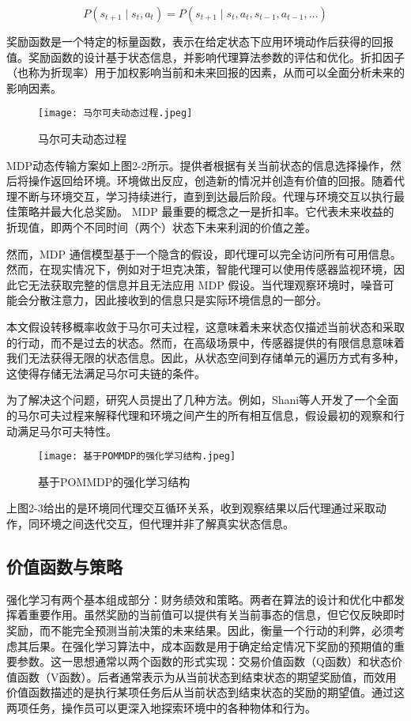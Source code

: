 \[
P(s_{t+1} \mid s_t, a_t) = P(s_{t+1} \mid s_t, a_t, s_{t-1}, a_{t-1}, \ldots)
\]

奖励函数是一个特定的标量函数，表示在给定状态下应用环境动作后获得的回报值。奖励函数的设计基于状态信息，并影响代理算法参数的评估和优化。折扣因子（也称为折现率）用于加权影响当前和未来回报的因素，从而可以全面分析未来的影响因素。

\begin{figure}[hbt]
	\centering
	\texttt{[image: 马尔可夫动态过程.jpeg]}
	\caption{马尔可夫动态过程}
	\label{f.example}
\end{figure}

MDP动态传输方案如上图2-2所示。提供者根据有关当前状态的信息选择操作，然后将操作返回给环境。环境做出反应，创造新的情况并创造有价值的回报。随着代理不断与环境交互，学习持续进行，直到到达最后阶段。代理与环境交互以执行最佳策略并最大化总奖励。 MDP 最重要的概念之一是折扣率。它代表未来收益的折现值，即两个不同时间（两个）状态下未来利润的价值之差。

然而，MDP 通信模型基于一个隐含的假设，即代理可以完全访问所有可用信息。然而，在现实情况下，例如对于坦克决策，智能代理可以使用传感器监视环境，因此它无法获取完整的信息并且无法应用 MDP 假设。当代理观察环境时，噪音可能会分散注意力，因此接收到的信息只是实际环境信息的一部分。

本文假设转移概率收敛于马尔可夫过程，这意味着未来状态仅描述当前状态和采取的行动，而不是过去的状态。然而，在高级场景中，传感器提供的有限信息意味着我们无法获得无限的状态信息。因此，从状态空间到存储单元的遍历方式有多种，这使得存储无法满足马尔可夫链的条件。

为了解决这个问题，研究人员提出了几种方法。例如，Shani\cite{shani2013survey}等人开发了一个全面的马尔可夫过程来解释代理和环境之间产生的所有相互信息，假设最初的观察和行动满足马尔可夫特性。

\begin{figure}[hbt]
	\centering
	\texttt{[image: 基于POMMDP的强化学习结构.jpeg]}
	\caption{基于POMMDP的强化学习结构}
	\label{f.example}
\end{figure}

上图2-3给出的是环境同代理交互循环关系，收到观察结果以后代理通过采取动作，同环境之间迭代交互，但代理并非了解真实状态信息。

\subsection{价值函数与策略}


强化学习有两个基本组成部分：财务绩效和策略。两者在算法的设计和优化中都发挥着重要作用。虽然奖励的当前值可以提供有关当前事态的信息，但它仅反映即时奖励，而不能完全预测当前决策的未来结果。因此，衡量一个行动的利弊，必须考虑其后果。在强化学习算法中，成本函数是用于确定给定情况下奖励的预期值的重要参数。这一思想通常以两个函数的形式实现：交易价值函数（Q函数）和状态价值函数（V函数）。后者通常表示为从当前状态到结束状态的期望奖励值，而效用价值函数描述的是执行某项任务后从当前状态到结束状态的奖励的期望值。通过这两项任务，操作员可以更深入地探索环境中的各种物体和行为。

